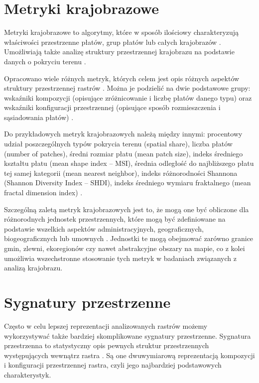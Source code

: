 \documentclass{amuthesis}
\begin{document}
\hypertarget{metryki-krajobrazowe}{%
\section{Metryki krajobrazowe}\label{metryki-krajobrazowe}}

Metryki krajobrazowe to algorytmy, które w sposób ilościowy
charakteryzują właściwości przestrzenne płatów, grup płatów lub całych
krajobrazów \autocite{McGarigal_fragstats}. Umożliwiają także analizę
struktury przestrzennej krajobrazu na podstawie danych o pokryciu terenu
\autocite{Pukowiec_Kurda_Sobala_2016}.

Opracowano wiele różnych metryk, których celem jest opis różnych
aspektów struktury przestrzennej rastrów \autocite{McGarigal_fragstats}.
Można je podzielić na dwie podstawowe grupy: wskaźniki kompozycji
(opisujące zróżnicowanie i liczbę płatów danego typu) oraz wskaźniki
konfiguracji przestrzennej (opisujące sposób rozmieszczenia i
sąsiadowania płatów) \autocite{solon2002,kozak2014}.

Do przykładowych metryk krajobrazowych należą między innymi: procentowy
udział poszczególnych typów pokrycia terenu (spatial share), liczba
płatów (number of patches), średni rozmiar płatu (mean patch size),
indeks średniego kształtu płatu (mean shape index -- MSI), średnia
odległość do najbliższego płatu tej samej kategorii (mean nearest
neighbor), indeks różnorodności Shannona (Shannon Diversity Index --
SHDI), indeks średniego wymiaru fraktalnego (mean fractal dimension
index) \autocite{landscapemetrics2019}.

Szczególną zaletą metryk krajobrazowych jest to, że mogą one być
obliczone dla różnorodnych jednostek przestrzennych, które mogą być
zdefiniowane na podstawie wszelkich aspektów administracyjnych,
geograficznych, biogeograficznych lub umownych
\autocite{Pukowiec_Kurda_Sobala_2016}. Jednostki te mogą obejmować
zarówno granice gmin, zlewni, ekoregionów czy nawet abstrakcyjne obszary
na mapie, co z kolei umożliwia wszechstronne stosowanie tych metryk w
badaniach związanych z analizą krajobrazu.

\hypertarget{sygnatury-przestrzenne}{%
\section{Sygnatury przestrzenne}\label{sygnatury-przestrzenne}}

Często w celu lepszej reprezentacji analizowanych rastrów możemy
wykorzystywać także bardziej skomplikowane sygnatury przestrzenne.
Sygnatura przestrzenna to statystyczny opis pewnych struktur
przestrzennych występujących wewnątrz rastra
\autocite{Jasiewicz_GeoPAT,nowosad_motif}. Są one dwuwymiarową
reprezentacją kompozycji i konfiguracji przestrzennej rastra, czyli jego
najbardziej podstawowych charakterystyk.
\end{document}
